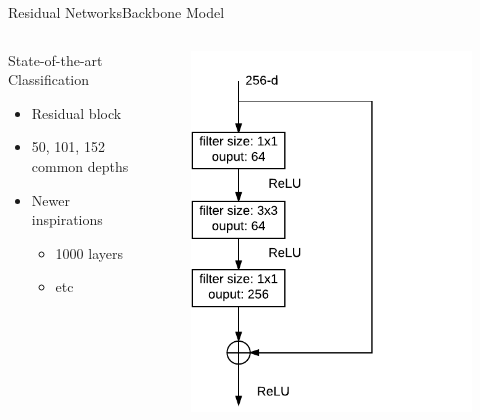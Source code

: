 \begin{frame}{Residual Networks}{Backbone Model}
\begin{columns}
        \begin{block}{State-of-the-art Classification}
        \begin{itemize}
            \item Residual block
            \item 50, 101, 152 common depths
            \item Newer inspirations
            \begin{itemize}
                \item 1000 layers
                \item etc
            \end{itemize}
        \end{itemize}
    \end{block}
        \begin{figure}
            \includegraphics[width=0.8 \textwidth]{figs/newresblock.pdf}
        \end{figure}
    \end{columns}
\end{frame}